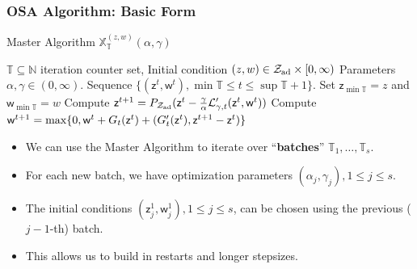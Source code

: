 \documentclass[aspectratio=169,xcolor=dvipsnames,11pt]{beamer}
\DeclarePairedDelimiter{\inner}{(}{)}
\newcommand{\setZ}{\mathcal{Z}}
\newcommand{\feas}{\setZ_{\rm ad}}
\newcommand{\scrL}{\mathcal{L}}
\newcommand{\con}{\mathsf{z}}
\newcommand{\pen}{\mathsf{w}}
\newcommand{\N}{\mathbb{N}}
\newcommand{\T}{\mathbb{T}}
\newcommand{\process}{\mathbb{X}}
\begin{document}
\begin{footnotesize}
\begin{frame}\frametitle{OSA Algorithm: Basic Form}
\begin{block}{Master Algorithm $\process_{\T}^{(z,w)}(\alpha,\gamma)$}
\label{alg:master}
\begin{algorithmic}[1]
 $\T\subseteq\N$ iteration counter set, Initial condition $(z,w)\in\feas\times[0,\infty)$ \;
Parameters $\alpha,\gamma\in(0,\infty)$. 
 Sequence $\{(\con^{t},\pen^{t}),\min\T\leq t\leq\sup\T+1\}$.
\STATE Set $\con_{\min\T}=z$ and $\pen_{\min\T} = w$\;
\FOR{$t=\min\T,\ldots,\sup\T$}
\STATE Compute $\con^{t+1}=P_{\feas}(\con^{t}-\frac{\gamma}{\alpha}\scrL'_{\gamma,t}(\con^{t},\pen^{t}))$\;
\STATE Compute $\pen^{t+1}=\max\{0,\pen^{t}+G_{t}(\con^{t})+\inner{G'_{t}(\con^{t}),\con^{t+1}-\con^{t}}\}$\;
\ENDFOR
\end{algorithmic}
\end{block}\pause
\begin{block}{}
\begin{itemize}
\item We can use the Master Algorithm to iterate over ``\textbf{batches}''  $\T_{1},\ldots,\T_{s}$.
\item For each new batch, we have optimization parameters $(\alpha_{j},\gamma_{j}),1\leq j\leq s$. 
\item The initial conditions $(\con_{j}^{1},\pen_{j}^{1}),1\leq j\leq s$, can be chosen using the previous ($j-1$-th) batch.
\item This allows us to build in restarts and longer stepsizes.
\end{itemize}
\end{block}
\end{frame}


\end{footnotesize}
\end{document}
